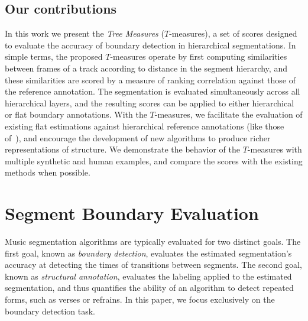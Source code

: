 \documentclass{article}
\begin{document}
\subsection{Our contributions}
In this work we present the \emph{Tree Measures} ($T$-measures), a set of scores designed to evaluate the accuracy of boundary detection in hierarchical segmentations.
In simple terms, the proposed $T$-measures operate by first computing similarities between frames of a track according to distance in the segment hierarchy, and these similarities are scored by
a measure of ranking correlation against those of the reference annotation.
The segmentation is evaluated simultaneously across all hierarchical layers, and the resulting scores can be applied to either hierarchical or flat boundary annotations.
With the $T$-measures, we facilitate the evaluation of existing flat estimations against hierarchical reference annotations (like those of~\cite{Smith2011}), and encourage the development of new algorithms
to produce richer representations of structure.
We demonstrate the behavior of the $T$-measures with multiple synthetic and human examples, and compare the scores with the existing methods when possible.


\section{Segment Boundary Evaluation}\label{sec:curr_meth}

Music segmentation algorithms are typically evaluated for two distinct goals.  
The first goal, known as \emph{boundary detection}, evaluates the estimated segmentation's accuracy at detecting the times of transitions between segments.
The second goal, known as \emph{structural annotation}, evaluates the labeling applied to the estimated segmentation, and thus quantifies the ability of an
algorithm to detect repeated forms, such as verses or refrains. 
In this paper, we focus exclusively on the boundary detection task.
\end{document}
